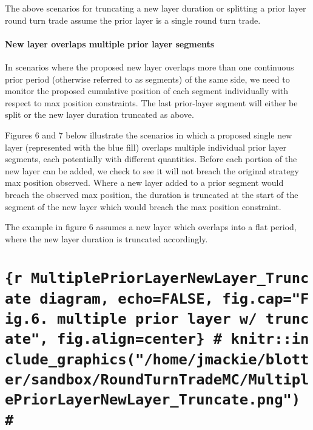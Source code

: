 The above scenarios for truncating a new layer duration or splitting a
prior layer round turn trade assume the prior layer is a single round
turn trade.

\hypertarget{new-layer-overlaps-multiple-prior-layer-segments}{%
\paragraph{New layer overlaps multiple prior layer
segments}\label{new-layer-overlaps-multiple-prior-layer-segments}}

In scenarios where the proposed new layer overlaps more than one
continuous prior period (otherwise referred to as segments) of the same
side, we need to monitor the proposed cumulative position of each
segment individually with respect to max position constraints. The last
prior-layer segment will either be split or the new layer duration
truncated as above.

Figures 6 and 7 below illustrate the scenarios in which a proposed
single new layer (represented with the blue fill) overlaps multiple
individual prior layer segments, each potentially with different
quantities. Before each portion of the new layer can be added, we check
to see it will not breach the original strategy max position observed.
Where a new layer added to a prior segment would breach the observed max
position, the duration is truncated at the start of the segment of the
new layer which would breach the max position constraint.

The example in figure 6 assumes a new layer which overlaps into a flat
period, where the new layer duration is truncated accordingly.

\hypertarget{r-multiplepriorlayernewlayer_truncate-diagram-echofalse-fig.capfig.6.-multiple-prior-layer-w-truncate-fig.aligncenter-knitrinclude_graphicshomejmackieblottersandboxroundturntrademcmultiplepriorlayernewlayer_truncate.png}{%
\section{\texorpdfstring{\texttt{\{r\ MultiplePriorLayerNewLayer\_Truncate\ diagram,\ echo=FALSE,\ fig.cap="Fig.6.\ multiple\ prior\ layer\ w/\ truncate",\ fig.align=\textquotesingle{}center\textquotesingle{}\}\ \#\ knitr::include\_graphics("/home/jmackie/blotter/sandbox/RoundTurnTradeMC/MultiplePriorLayerNewLayer\_Truncate.png")\ \#}}{\{r MultiplePriorLayerNewLayer\_Truncate diagram, echo=FALSE, fig.cap="Fig.6. multiple prior layer w/ truncate", fig.align='center'\} \# knitr::include\_graphics("/home/jmackie/blotter/sandbox/RoundTurnTradeMC/MultiplePriorLayerNewLayer\_Truncate.png") \#}}\label{r-multiplepriorlayernewlayer_truncate-diagram-echofalse-fig.capfig.6.-multiple-prior-layer-w-truncate-fig.aligncenter-knitrinclude_graphicshomejmackieblottersandboxroundturntrademcmultiplepriorlayernewlayer_truncate.png}}

